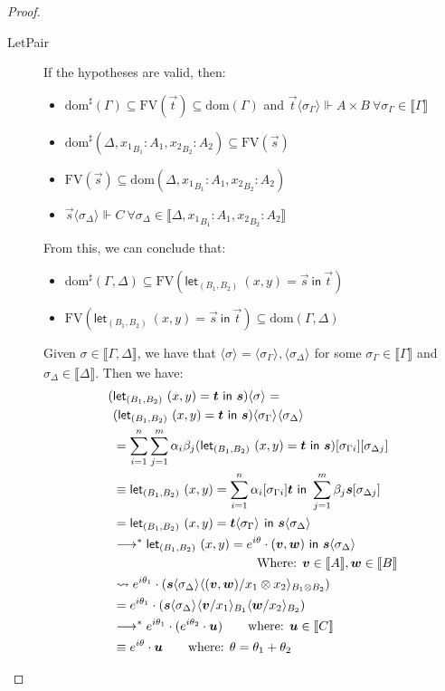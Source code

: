 \documentclass[runningheads,orivec,envcountsame,envcountsect]{llncs}
\newcommand\lra{\longrightarrow}
\newcommand\ansubst[2]{\ensuremath{\langle #1 \rangle_{#2}}}
\newcommand\dom[1]{\mathrm{dom}(#1)}
\newcommand\sdom[1]{\mathrm{dom}^{\sharp}(#1)}
\newcommand\FV[1]{\mathrm{FV}(#1)}
\def\Pair#1#2{(#1,#2)} %
\def\letkeyword{\mathsf{let}}
\def\inkeyword{\mathsf{in}}
\def\LetP#1#2#3#4#5#6{\letkeyword_{\Pair{#2}{#4}}~\Pair{#1}{#3}=#5~\inkeyword~#6}
\def\lraneq{\rightsquigarrow}
\def\eval{\lra^*}
\def\sem#1{\llbracket#1\rrbracket}
\begin{document}
\begin{proof}
\begin{description}
    \item[LetPair] If the hypotheses are valid, then:
    \begin{itemize}
        \item $\sdom{\Gamma}\subseteq \FV{\vec t} \subseteq \dom{\Gamma}$ and $\vec t \ansubst{\sigma_\Gamma}{}\Vdash A\times B\ \forall \sigma_\Gamma\in\sem\Gamma$
        \item $\sdom{\Delta, {x_1}_{B_1}:A_1, {x_2}_{B_2}:A_2}\subseteq\FV{\vec s}$
        \item $\FV{\vec{s}}\subseteq \dom{\Delta,{x_1}_{B_1}:A_1, {x_2}_{B_2}:A_2}$
        \item $\vec s \ansubst{\sigma_\Delta}{}\Vdash C\ \forall \sigma_\Delta\in\sem{\Delta, {x_1}_{B_1}:A_1, {x_2}_{B_2}:A_2}$
    \end{itemize}
    From this, we can conclude that:
    \begin{itemize}
        \item $\sdom{\Gamma,\Delta}\subseteq\FV{\LetP{x}{B_1}{y}{B_2}{\vec{s}}{\vec{t}}}$
        \item $\FV{\LetP{x}{B_1}{y}{B_2}{\vec{s}}{\vec{t}}}\subseteq\dom{\Gamma,\Delta}$
    \end{itemize}
    
    Given $\sigma\in\sem{\Gamma,\Delta}$, we have that $\ansubst{\sigma}{}=\ansubst{\sigma_\Gamma}{},\ansubst{\sigma_\Delta}{}$ for some $\sigma_\Gamma\in\sem\Gamma$ and $\sigma_\Delta\in\sem\Delta$. Then we have:
    \begin{align*}
        (&\LetP{x}{B_1}{y}{B_2}{\vec{t}}{\vec{s}})\ansubst{\sigma}{} = \\
        &(\LetP{x}{B_1}{y}{B_2}{\vec{t}}{\vec{s}})\ansubst{\sigma_\Gamma}{}\ansubst{\sigma_\Delta}{}\\
        &= \sum_{i=1}^{n}\sum_{j=1}^{m}\alpha_i\beta_j(\LetP{x}{B_1}{y}{B_2}{\vec{t}}{\vec{s}})[\sigma_{\Gamma i}][\sigma_{\Delta j}]\\
        &\equiv \LetP{x}{B_1}{y}{B_2}{\sum_{i=1}^{n}\alpha_i[\sigma_{\Gamma i}]\vec{t}}{\sum_{j=1}^{m}\beta_j \vec{s}[\sigma_{\Delta j}]}\\
        &= \LetP{x}{B_1}{y}{B_2}{\vec{t}\ansubst{\sigma_\Gamma}{}}{\vec{s}\ansubst{\sigma_\Delta}{}}\\
        &\eval \LetP{x}{B_1}{y}{B_2}{e^{i\theta}\cdot\Pair{\vec{v}}{\vec{w}}}{\vec{s}\ansubst{\sigma_\Delta}{}}\\
        &\hspace*{4cm}{\text{Where: }}\vec{v}\in\sem{A},\vec{w}\in\sem{B}\\
        &\lraneq e^{i\theta_1}\cdot(\vec{s}\ansubst{\sigma_\Delta}{}\ansubst{\Pair{\vec{v}}{\vec{w}}/x_1\otimes x_2}{B_1\otimes B_2})\\
        &= e^{i\theta_1}\cdot(\vec{s}\ansubst{\sigma_\Delta}{}\ansubst{\vec{v}/x_1}{B_1}\ansubst{\vec{w}/x_2}{B_2})\\
        &\eval e^{i\theta_1}\cdot (e^{i\theta_2}\cdot \vec{u})\qquad\text{where: }\vec{u}\in\sem{C}\\
        &\equiv e^{i\theta}\cdot \vec{u}\qquad\text{where: }\theta=\theta_1 + \theta_2
    \end{align*}
    

\end{description}
\end{proof}
\end{document}
